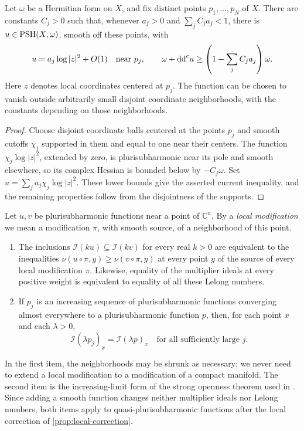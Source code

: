 \begin{lemma}\label{lem:small-isolated-log-poles}
Let $\omega$ be a Hermitian form on $X$, and fix distinct points $p_1,\ldots,p_N$ of $X$. There are constants $C_j>0$ such that, whenever $a_j>0$ and $\sum_jC_ja_j<1$, there is $u\in\mathrm{PSH}(X,\omega)$, smooth off these points, with
\[
 u=a_j\log|z|^2+O(1)\quad\hbox{near }p_j,\qquad
 \omega+\mathrm{dd}^{\mathrm{c}} u\geq\left(1-\sum_jC_ja_j\right)\omega.
\]
Here $z$ denotes local coordinates centered at $p_j$. The function can be chosen to vanish outside arbitrarily small disjoint coordinate neighborhoods, with the constants depending on those neighborhoods.
\end{lemma}
\begin{proof}
Choose disjoint coordinate balls centered at the points $p_j$ and smooth cutoffs $\chi_j$ supported in them and equal to one near their centers. The function $\chi_j\log|z|^2$, extended by zero, is plurisubharmonic near its pole and smooth elsewhere, so its complex Hessian is bounded below by $-C_j\omega$. Set $u=\sum_ja_j\chi_j\log|z|^2$. These lower bounds give the asserted current inequality, and the remaining properties follow from the disjointness of the supports.
\end{proof}

\begin{theorem}\label{thm:local-i-inputs}
Let $u,v$ be plurisubharmonic functions near a point of $\mathbb C^n$. By a \emph{local modification} we mean a modification $\pi$, with smooth source, of a neighborhood of this point.
\begin{enumerate}
\item The inclusions $\mathcal I(ku)\subseteq\mathcal I(kv)$ for every real $k>0$ are equivalent to the inequalities $\nu(u\circ\pi,y)\geq\nu(v\circ\pi,y)$ at every point $y$ of the source of every local modification $\pi$. Likewise, equality of the multiplier ideals at every positive weight is equivalent to equality of all these Lelong numbers.
\item If $p_j$ is an increasing sequence of plurisubharmonic functions converging almost everywhere to a plurisubharmonic function $p$, then, for each point $x$ and each $\lambda>0$,
\[
 \mathcal I(\lambda p_j)_x=\mathcal I(\lambda p)_x
 \quad\text{for all sufficiently large }j.
\]
\end{enumerate}
\end{theorem}

In the first item, the neighborhoods may be shrunk as necessary; we never need to extend a local modification to a modification of a compact manifold. The second item is the increasing-limit form of the strong openness theorem used in \cite{SGPT}. Since adding a smooth function changes neither multiplier ideals nor Lelong numbers, both items apply to quasi-plurisubharmonic functions after the local correction of \cref{prop:local-correction}.

